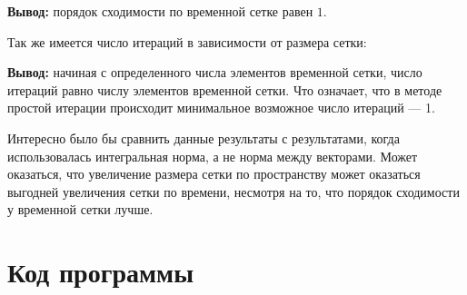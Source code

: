 \textbf{Вывод:} порядок сходимости по временной сетке равен $1$.

Так же имеется число итераций в зависимости от размера сетки:

\noindent{}

\textbf{Вывод:} начиная с определенного числа элементов временной сетки, число итераций равно числу элементов временной сетки. Что означает, что в методе простой итерации происходит минимальное возможное число итераций --- 1.

Интересно было бы сравнить данные результаты с результатами, когда использовалась интегральная норма, а не норма между векторами. Может оказаться, что увеличение размера сетки по пространству может оказаться выгодней увеличения сетки по времени, несмотря на то, что порядок сходимости у временной сетки лучше.



\section{Код программы}

